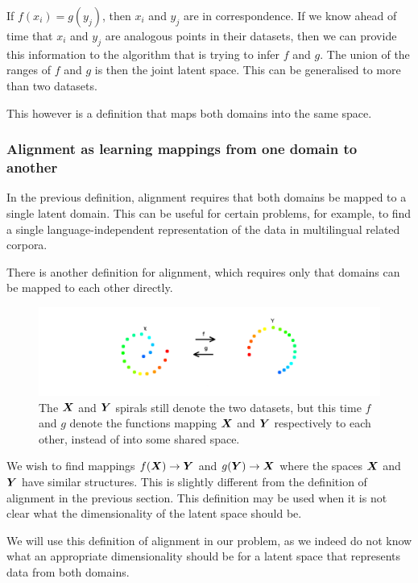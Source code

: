 If $f(x_i) = g(y_j)$, then $x_i$ and $y_j$ are in correspondence. If we know ahead of time that $x_i$ and $y_j$ are analogous points in their datasets, then we can provide this information to the algorithm that is trying to infer $f$ and $g$. The union of the ranges of $f$ and $g$ is then the joint latent space. This can be generalised to more than two datasets. 

This however is a definition that maps both domains into the same space. 

\subsubsection{Alignment as learning mappings from one domain to another}

In the previous definition, alignment requires that both domains be mapped to a single latent domain. This can be useful for certain problems, for example, to find a single language-independent representation of the data in multilingual related corpora. 

There is another definition for alignment, which requires only that domains can be mapped to each other directly. 

\begin{figure}[H]
\label{fig:alignment2}
    \centering
    \includegraphics[width=\textwidth]{images/review/alignment2.png}
    \caption{
        The $\boldsymbol{X}$ and $\boldsymbol{Y}$ spirals still denote the two datasets, but this time $f$ and $g$ denote the functions mapping $\boldsymbol{X}$ and $\boldsymbol{Y}$ respectively to each other, instead of into some shared space.
    }
\end{figure}

We wish to find mappings $f(\boldsymbol{X}) \rightarrow \boldsymbol{Y}$ and $g(\boldsymbol{Y}) \rightarrow \boldsymbol{X}$ where the spaces $\boldsymbol{X}$ and $\boldsymbol{Y}$  have similar structures. This is slightly different from the definition of alignment in the previous section. This definition may be used when it is not clear what the dimensionality of the latent space should be. 

We will use this definition of alignment in our problem, as we indeed do not know what an appropriate dimensionality should be for a latent space that represents data from both domains. 

